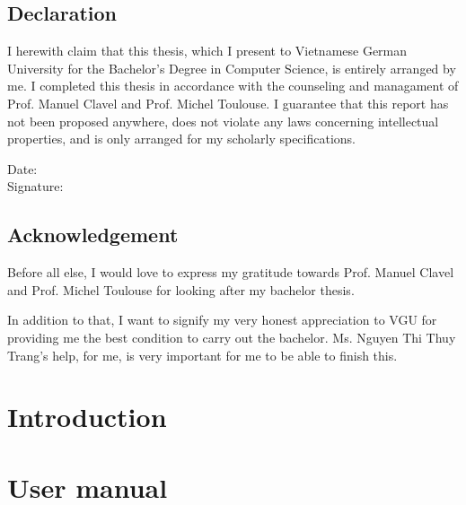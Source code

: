\documentclass[a4paper, 11pt,openany]{book} %
\begin{document}
\pagestyle{plain}


\noindent
\section*{Declaration}
I herewith claim that this thesis, which I present to Vietnamese German University for the Bachelor's Degree in Computer Science, is entirely arranged by me. I completed this thesis in accordance with the counseling and managament of Prof. Manuel Clavel and Prof. Michel Toulouse. I guarantee that this report has not been proposed anywhere, does not violate any laws concerning intellectual properties, and is only arranged for my scholarly specifications.


Date: \\ 
Signature: 
\clearpage
\section*{Acknowledgement}
Before all else, I would love to express my gratitude towards Prof. Manuel Clavel and Prof. Michel Toulouse for looking after my bachelor thesis.\par
In addition to that, I want to signify my very honest appreciation to VGU for providing me the best condition to carry out the bachelor. Ms. Nguyen Thi Thuy Trang's help, for me, is very important for me to be able to finish this.


\clearpage

\tableofcontents
\chapter{Introduction}
\chapter{User manual}
\end{document}
